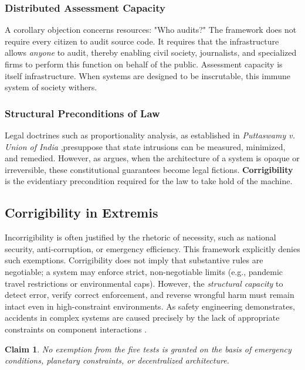 \documentclass{article}
\newtheorem{claim}{Claim}
\begin{document}
\subsubsection{Distributed Assessment Capacity}
A corollary objection concerns resources: "Who audits?" The framework does not require every citizen to audit source code. It requires that the infrastructure allows \textit{anyone} to audit, thereby enabling civil society, journalists, and specialized firms to perform this function on behalf of the public. Assessment capacity is itself infrastructure. When systems are designed to be inscrutable, this immune system of society withers.

\subsubsection{Structural Preconditions of Law}
Legal doctrines such as proportionality analysis, as established in \textit{Puttaswamy v. Union of India} \citep{puttaswamy2017},presuppose that state intrusions can be measured, minimized, and remedied. However, as \citet{bhatia2019} argues, when the architecture of a system is opaque or irreversible, these constitutional guarantees become legal fictions. \textbf{Corrigibility} is the evidentiary precondition required for the law to take hold of the machine.

\subsection{Corrigibility in Extremis}

Incorrigibility is often justified by the rhetoric of necessity, such as national security, anti-corruption, or emergency efficiency. This framework explicitly denies such exemptions. Corrigibility does not imply that substantive rules are negotiable; a system may enforce strict, non-negotiable limits (e.g., pandemic travel restrictions or environmental caps). However, the \textit{structural capacity} to detect error, verify correct enforcement, and reverse wrongful harm must remain intact even in high-constraint environments. As safety engineering demonstrates, accidents in complex systems are caused precisely by the lack of appropriate constraints on component interactions \citep{leveson2011}.

\begin{claim}
No exemption from the five tests is granted on the basis of emergency conditions, planetary constraints, or decentralized architecture.
\end{claim}
\end{document}
